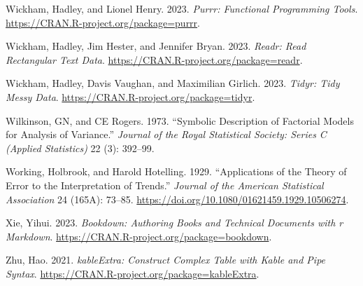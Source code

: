 \documentclass[
]{book}
\newlength{\cslhangindent}
\newlength{\cslentryspacingunit} %
\newenvironment{CSLReferences}[2] %
 {%
  \setlength{\parindent}{0pt}
  \ifodd #1
  \let\oldpar\par
  \def\par{\hangindent=\cslhangindent\oldpar}
  \fi
  \setlength{\parskip}{#2\cslentryspacingunit}
 }%
 {}
\theoremstyle{definition}
\theoremstyle{definition}
\theoremstyle{definition}
\theoremstyle{definition}
\theoremstyle{remark}
\begin{document}
\begin{CSLReferences}{1}{0}
\leavevmode{}%
Wickham, Hadley, and Lionel Henry. 2023. \emph{Purrr: Functional Programming Tools}. \url{https://CRAN.R-project.org/package=purrr}.

\leavevmode{}%
Wickham, Hadley, Jim Hester, and Jennifer Bryan. 2023. \emph{Readr: Read Rectangular Text Data}. \url{https://CRAN.R-project.org/package=readr}.

\leavevmode{}%
Wickham, Hadley, Davis Vaughan, and Maximilian Girlich. 2023. \emph{Tidyr: Tidy Messy Data}. \url{https://CRAN.R-project.org/package=tidyr}.

\leavevmode{}%
Wilkinson, GN, and CE Rogers. 1973. {``Symbolic Description of Factorial Models for Analysis of Variance.''} \emph{Journal of the Royal Statistical Society: Series C (Applied Statistics)} 22 (3): 392--99.

\leavevmode{}%
Working, Holbrook, and Harold Hotelling. 1929. {``Applications of the Theory of Error to the Interpretation of Trends.''} \emph{Journal of the American Statistical Association} 24 (165A): 73--85. \url{https://doi.org/10.1080/01621459.1929.10506274}.

\leavevmode{}%
Xie, Yihui. 2023. \emph{Bookdown: Authoring Books and Technical Documents with r Markdown}. \url{https://CRAN.R-project.org/package=bookdown}.

\leavevmode{}%
Zhu, Hao. 2021. \emph{kableExtra: Construct Complex Table with Kable and Pipe Syntax}. \url{https://CRAN.R-project.org/package=kableExtra}.

\end{CSLReferences}
\end{document}
